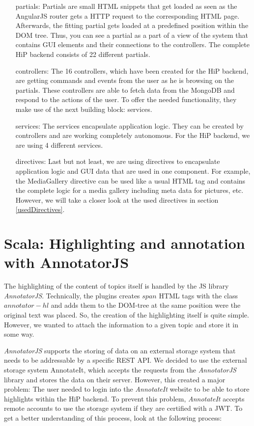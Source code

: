\begin{itemize}
	\item[partials:] Partials are small \ac{HTML} snippets that get loaded as seen as the AngularJS router gets a \ac{HTTP} request to the corresponding \ac{HTML} page. Afterwards, the fitting partial gets loaded at a predefined position within the \ac{DOM} tree. Thus, you can see a partial as a part of a view of the system that contains \ac{GUI} elements and their connections to the controllers.  The complete \ac{HiP} backend consists of 22 different partials.  
	\item[controllers:] The 16 controllers, which have been created for the \ac{HiP} backend, are getting commands and events from the user as he is browsing on the partials. These controllers are able to fetch data from the MongoDB and respond to the actions of the user. To offer the needed functionality, they make use of the next building block: services.  
	\item[services:] The services encapsulate application logic. They can be created by controllers and are working completely autonomous. For the \ac{HiP} backend, we are using 4 different services.
	\item[directives:] Last but not least, we are using directives to encapsulate application logic and \ac{GUI} data that are used in one component. For example, the MediaGallery directive can be used like a usual \ac{HTML} tag and contains the complete logic for a media gallery including meta data for pictures, etc. However, we will take a closer look at the used directives in section \ref{usedDirectives}.
\end{itemize}

\section{Scala: Highlighting and annotation with AnnotatorJS}
The highlighting of the content of topics itself is handled by the \ac{JS} library \emph{AnnotatorJS}. Technically, the plugins creates $span$ \ac{HTML} tags  with the class $annotator-hl$ and adds them to the \ac{DOM}-tree at the same position were the original text was placed. So, the creation of the highlighting itself is quite simple. However, we wanted to attach the information to a given topic and store it in some way.  

\emph{AnnotatorJS} supports the storing of data on an external storage system that needs to be addressable by a specific \ac{REST} \ac{API}. We decided to use the external storage system \ac{AnnotateIt}, which accepts the requests from the \emph{AnnotatorJS} library and stores the data on their server. However, this created a major problem: The user needed to login into the \emph{AnnotateIt} website to be able to store highlights within the \ac{HiP} backend. To prevent this problem, \emph{AnnotateIt} accepts remote accounts to use the storage system if they are certified with a \ac{JWT}. To get a better understanding of this process, look at the following process:

